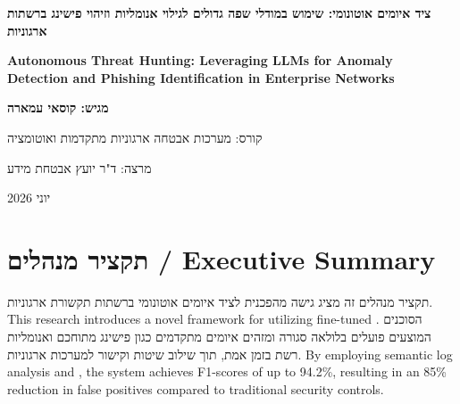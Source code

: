 \documentclass[11pt,a4paper]{article}
\begin{document}
\begin{titlepage}
\centering
\vspace*{1.5cm}
{\Huge\bfseries ציד איומים אוטונומי: שימוש במודלי שפה גדולים לגילוי אנומליות וזיהוי פישינג ברשתות ארגוניות \par}
\vspace{1cm}
{\Large\bfseries Autonomous Threat Hunting: Leveraging LLMs for Anomaly Detection and Phishing Identification in Enterprise Networks \par}
\vspace{2cm}
{\large\bfseries מגיש: קוסאי עמארה \par}
\vspace{0.8cm}
{\large קורס: מערכות אבטחה ארגוניות מתקדמות ואוטומציה \par}
\vspace{0.8cm}
{\large מרצה: ד"ר יועץ אבטחת מידע \par}
\vspace{2cm}
{\large יוני 2026 \par}
\end{titlepage}

\thispagestyle{empty}
\setcounter{page}{2}


\tableofcontents
\newpage




\section{תקציר מנהלים / Executive Summary}
תקציר מנהלים זה מציג גישה מהפכנית לציד איומים אוטונומי ברשתות תקשורת ארגוניות.
This research introduces a novel framework for  utilizing fine-tuned .
הסוכנים המוצעים פועלים בלולאה סגורה ומזהים איומים מתקדמים כגון פישינג מתוחכם ואנומליות רשת בזמן אמת, תוך שילוב שיטות  וקישור למערכות  ארגוניות.
By employing semantic log analysis and , the system achieves F1-scores of up to 94.2\%, resulting in an 85\% reduction in false positives compared to traditional security controls.
\end{document}
